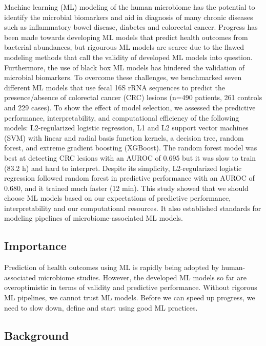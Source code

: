 \documentclass[11pt,]{article}
\begin{document}
Machine learning (ML) modeling of the human microbiome has the potential
to identify the microbial biomarkers and aid in diagnosis of many
chronic diseases such as inflammatory bowel disease, diabetes and
colorectal cancer. Progress has been made towards developing ML models
that predict health outcomes from bacterial abundances, but rigourous ML
models are scarce due to the flawed modeling methods that call the
validity of developed ML models into question. Furthermore, the use of
black box ML models has hindered the validation of microbial biomarkers.
To overcome these challenges, we benchmarked seven different ML models
that use fecal 16S rRNA sequences to predict the presence/absence of
colorectal cancer (CRC) lesions (n=490 patients, 261 controls and 229
cases). To show the effect of model selection, we assessed the
predictive performance, interpretability, and computational efficiency
of the following models: L2-regularized logistic regression, L1 and L2
support vector machines (SVM) with linear and radial basis function
kernels, a decision tree, random forest, and extreme gradient boosting
(XGBoost). The random forest model was best at detecting CRC lesions
with an AUROC of 0.695 but it was slow to train (83.2 h) and hard to
interpret. Despite its simplicity, L2-regularized logistic regression
followed random forest in predictive performance with an AUROC of 0.680,
and it trained much faster (12 min). This study showed that we should
choose ML models based on our expectations of predictive performance,
interpretability and our computational resources. It also established
standards for modeling pipelines of microbiome-associated ML models.

\newpage

\subsection{Importance}\label{importance}

Prediction of health outcomes using ML is rapidly being adopted by
human-associated microbiome studies. However, the developed ML models so
far are overoptimistic in terms of validity and predictive performance.
Without rigorous ML pipelines, we cannot trust ML models. Before we can
speed up progress, we need to slow down, define and start using good ML
practices. \newpage

\subsection{Background}\label{background}
\end{document}
